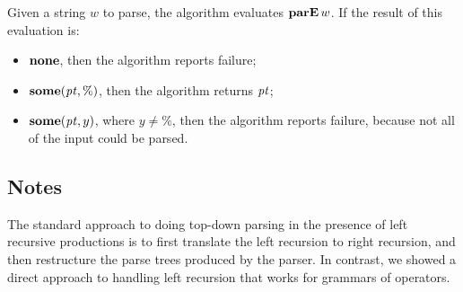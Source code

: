 Given a string $w$ to parse, the algorithm evaluates
$\mathbf{parE}\,w$.  If the result of this evaluation is:
\begin{itemize}
\item $\mathbf{none}$, then the algorithm reports failure;

\item $\mathbf{some}({\it pt},\%)$, then the algorithm returns ${\it pt}$;

\item $\mathbf{some}({\it pt},y)$, where $y\neq\%$, then the algorithm reports failure,
  because not all of the input could be parsed.
\end{itemize}

\subsection{Notes}

The standard approach to doing top-down parsing in the presence of
left recursive productions is to first translate the left recursion to
right recursion, and then restructure the parse trees produced by the
parser.  In contrast, we showed a direct approach to handling left
recursion that works for grammars of operators.

